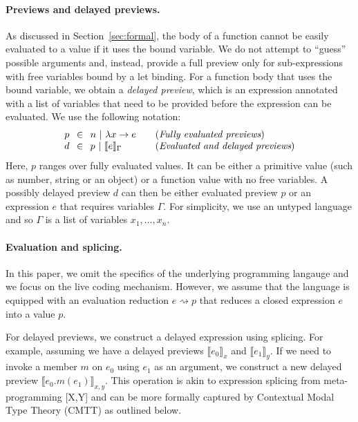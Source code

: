 \documentclass[sigplan,10pt]{acmart}\settopmatter{printfolios=true,printccs=false,printacmref=false}
\begin{document}
\paragraph{Previews and delayed previews.}
As discussed in Section~\ref{sec:formal}, the body of a function cannot be easily evaluated to
a value if it uses the bound variable. We do not attempt to ``guess'' possible arguments and,
instead, provide a full preview only for sub-expressions with free variables bound by a let binding.
For a function body that uses the bound variable, we obtain a \emph{delayed preview}, which is
an expression annotated with a list of variables that need to be provided before the expression
can be evaluated. We use the following notation:
%
\begin{equation*}
\begin{array}{rcll}
p&\hspace{-0.25em}\in\hspace{-0.25em}&n~|~\lambda x\rightarrow e&\quad(\textit{Fully evaluated previews})\\
d&\hspace{-0.25em}\in\hspace{-0.25em}&p~|~\llbracket e \rrbracket_\Gamma&\quad(\textit{Evaluated and delayed previews})\\
\end{array}
\end{equation*}
%
Here, $p$ ranges over fully evaluated values. It can be either a primitive value (such as number,
string or an object) or a function value with no free variables. A possibly delayed preview $d$ 
can then be either evaluated preview $p$ or an expression $e$ that requires variables $\Gamma$.
For simplicity, we use an untyped language and so $\Gamma$ is a list of variables $x_1, \ldots, x_n$.

\paragraph{Evaluation and splicing.}
In this paper, we omit the specifics of the underlying programming langauge and we focus on the
live coding mechanism. However, we assume that the language is equipped with an evaluation 
reduction $e \rightsquigarrow p$ that reduces a closed expression $e$ into a value $p$.

For delayed previews, we construct a delayed expression using splicing. For example, assuming
we have a delayed previews $\llbracket e_0 \rrbracket_x$ and $\llbracket e_1 \rrbracket_y$. 
If we need to invoke a member $m$ on $e_0$ using $e_1$ as an argument, we construct a new 
delayed preview $\llbracket e_0.m(e_1) \rrbracket_{x, y}$. This operation is akin to expression
splicing from meta-programming [X,Y] and can be more formally captured by Contextual Modal Type 
Theory (CMTT) as outlined below.
\end{document}
